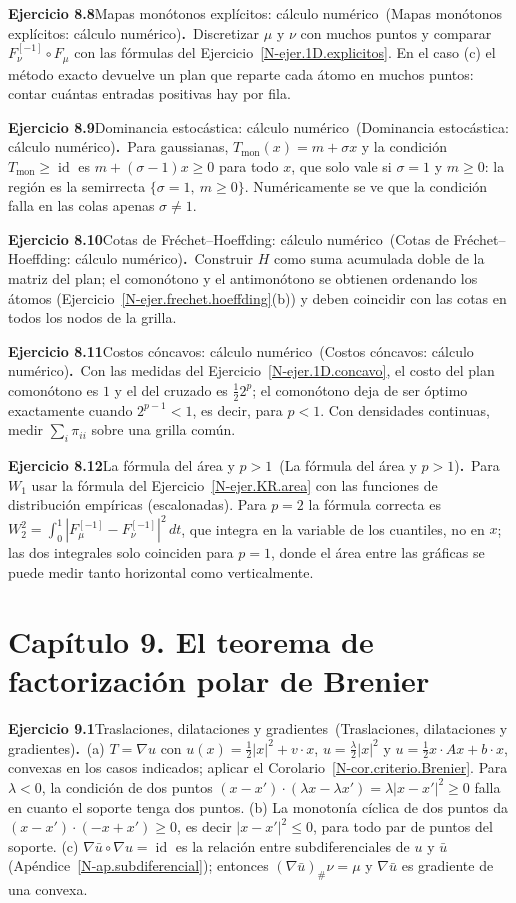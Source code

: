 \documentclass[11pt,a4paper]{amsart}
\newcommand{\id}{\operatorname{id}}
\theoremstyle{remark}
\theoremstyle{definition}
\numberwithin{subsection}{section}
\numberwithin{equation}{section}
\newcommand{\ejlabel}[2]{\par\medskip\noindent\textbf{Ejercicio #1}\ifx\relax#2\relax\else\ (#2)\fi\textbf{.}\ }
\begin{document}
\ejlabel{8.8}{Mapas monótonos explícitos: cálculo numérico}Discretizar $\mu$ y $\nu$ con muchos puntos y comparar $F_\nu^{[-1]}\circ F_\mu$ con las fórmulas del Ejercicio~\ref{N-ejer.1D.explicitos}. En el caso (c) el método exacto devuelve un plan que reparte cada átomo en muchos puntos: contar cuántas entradas positivas hay por fila.

\ejlabel{8.9}{Dominancia estocástica: cálculo numérico}Para gaussianas, $T_\text{mon}(x)=m+\sigma x$ y la condición $T_\text{mon}\ge\id$ es $m+(\sigma-1)x\ge0$ para todo $x$, que solo vale si $\sigma=1$ y $m\ge0$: la región es la semirrecta $\{\sigma=1,\ m\ge0\}$. Numéricamente se ve que la condición falla en las colas apenas $\sigma\ne1$.

\ejlabel{8.10}{Cotas de Fréchet--Hoeffding: cálculo numérico}Construir $H$ como suma acumulada doble de la matriz del plan; el comonótono y el antimonótono se obtienen ordenando los átomos (Ejercicio~\ref{N-ejer.frechet.hoeffding}(b)) y deben coincidir con las cotas en todos los nodos de la grilla.

\ejlabel{8.11}{Costos cóncavos: cálculo numérico}Con las medidas del Ejercicio~\ref{N-ejer.1D.concavo}, el costo del plan comonótono es $1$ y el del cruzado es $\frac12 2^p$; el comonótono deja de ser óptimo exactamente cuando $2^{p-1}<1$, es decir, para $p<1$. Con densidades continuas, medir $\sum_i\pi_{ii}$ sobre una grilla común.

\ejlabel{8.12}{La fórmula del área y $p>1$}Para $W_1$ usar la fórmula del Ejercicio~\ref{N-ejer.KR.area} con las funciones de distribución empíricas (escalonadas). Para $p=2$ la fórmula correcta es $W_2^2=\int_0^1|F_\mu^{[-1]}-F_\nu^{[-1]}|^2\,dt$, que integra en la variable de los cuantiles, no en $x$; las dos integrales solo coinciden para $p=1$, donde el área entre las gráficas se puede medir tanto horizontal como verticalmente.

\section*{Capítulo 9. El teorema de factorización polar de Brenier}
\ejlabel{9.1}{Traslaciones, dilataciones y gradientes}(a) $T=\nabla u$ con $u(x)=\frac12|x|^2+v\cdot x$, $u=\frac\lambda2|x|^2$ y $u=\frac12x\cdot Ax+b\cdot x$, convexas en los casos indicados; aplicar el Corolario~\ref{N-cor.criterio.Brenier}. Para $\lambda<0$, la condición de dos puntos $(x-x')\cdot(\lambda x-\lambda x')=\lambda|x-x'|^2\ge0$ falla en cuanto el soporte tenga dos puntos. (b) La monotonía cíclica de dos puntos da $(x-x')\cdot(-x+x')\ge0$, es decir $|x-x'|^2\le0$, para todo par de puntos del soporte. (c) $\nabla\bar u\circ\nabla u=\id$ es la relación entre subdiferenciales de $u$ y $\bar u$ (Apéndice~\ref{N-ap.subdiferencial}); entonces $(\nabla\bar u)_\#\nu=\mu$ y $\nabla\bar u$ es gradiente de una convexa.
\end{document}
